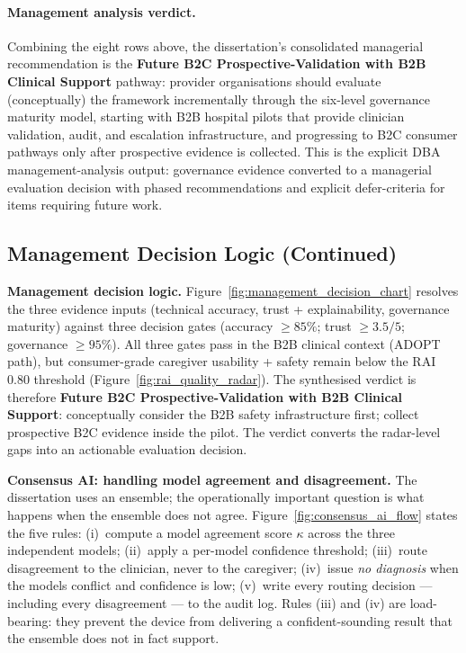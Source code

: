 \paragraph{Management analysis verdict.}
\label{para:management_analysis_verdict}
Combining the eight rows above, the dissertation's consolidated managerial recommendation is the \textbf{Future B2C Prospective-Validation with B2B Clinical Support} pathway: provider organisations should evaluate (conceptually) the framework incrementally through the six-level governance maturity model, starting with B2B hospital pilots that provide clinician validation, audit, and escalation infrastructure, and progressing to B2C consumer pathways only after prospective evidence is collected. This is the explicit DBA management-analysis output: governance evidence converted to a managerial evaluation decision with phased recommendations and explicit defer-criteria for items requiring future work.

\subsection{Management Decision Logic (Continued)}
\label{sec:management_decision_logic_continued}

\noindent\textbf{Management decision logic.} Figure~\ref{fig:management_decision_chart} resolves the three evidence inputs (technical accuracy, trust + explainability, governance maturity) against three decision gates (accuracy $\geq 85\%$; trust $\geq 3.5/5$; governance $\geq 95\%$). All three gates pass in the B2B clinical context (ADOPT path), but consumer-grade caregiver usability + safety remain below the RAI 0.80 threshold (Figure~\ref{fig:rai_quality_radar}). The synthesised verdict is therefore \textbf{Future B2C Prospective-Validation with B2B Clinical Support}: conceptually consider the B2B safety infrastructure first; collect prospective B2C evidence inside the pilot. The verdict converts the radar-level gaps into an actionable evaluation decision.



\noindent\textbf{Consensus AI: handling model agreement and disagreement.} The dissertation uses an ensemble; the operationally important question is what happens when the ensemble does not agree. Figure~\ref{fig:consensus_ai_flow} states the five rules: (i)~compute a model agreement score $\kappa$ across the three independent models; (ii)~apply a per-model confidence threshold; (iii)~route disagreement to the clinician, never to the caregiver; (iv)~issue \emph{no diagnosis} when the models conflict and confidence is low; (v)~write every routing decision --- including every disagreement --- to the audit log. Rules (iii) and (iv) are load-bearing: they prevent the device from delivering a confident-sounding result that the ensemble does not in fact support.


